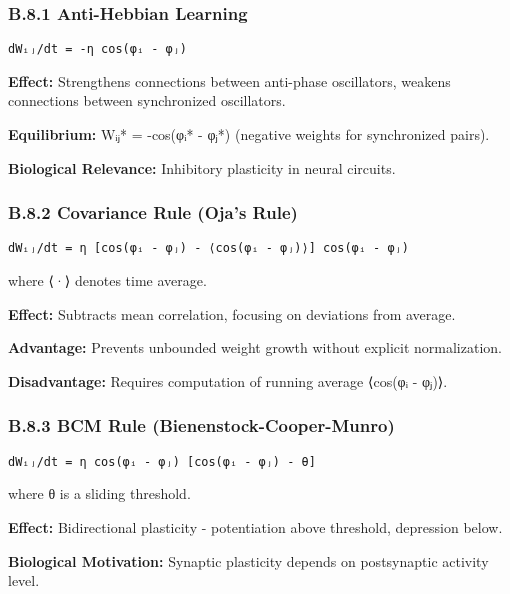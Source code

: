 \documentclass[
]{article}
\begin{document}
\subsubsection{B.8.1 Anti-Hebbian
Learning}\label{b.8.1-anti-hebbian-learning}

\begin{verbatim}
dWᵢⱼ/dt = -η cos(φᵢ - φⱼ)
\end{verbatim}

\textbf{Effect:} Strengthens connections between anti-phase oscillators,
weakens connections between synchronized oscillators.

\textbf{Equilibrium:} Wᵢⱼ* = -cos(φᵢ* - φⱼ*) (negative weights for
synchronized pairs).

\textbf{Biological Relevance:} Inhibitory plasticity in neural circuits.

\subsubsection{B.8.2 Covariance Rule (Oja's
Rule)}\label{b.8.2-covariance-rule-ojas-rule}

\begin{verbatim}
dWᵢⱼ/dt = η [cos(φᵢ - φⱼ) - ⟨cos(φᵢ - φⱼ)⟩] cos(φᵢ - φⱼ)
\end{verbatim}

where ⟨·⟩ denotes time average.

\textbf{Effect:} Subtracts mean correlation, focusing on deviations from
average.

\textbf{Advantage:} Prevents unbounded weight growth without explicit
normalization.

\textbf{Disadvantage:} Requires computation of running average ⟨cos(φᵢ -
φⱼ)⟩.

\subsubsection{B.8.3 BCM Rule
(Bienenstock-Cooper-Munro)}\label{b.8.3-bcm-rule-bienenstock-cooper-munro}

\begin{verbatim}
dWᵢⱼ/dt = η cos(φᵢ - φⱼ) [cos(φᵢ - φⱼ) - θ]
\end{verbatim}

where θ is a sliding threshold.

\textbf{Effect:} Bidirectional plasticity - potentiation above
threshold, depression below.

\textbf{Biological Motivation:} Synaptic plasticity depends on
postsynaptic activity level.
\end{document}
